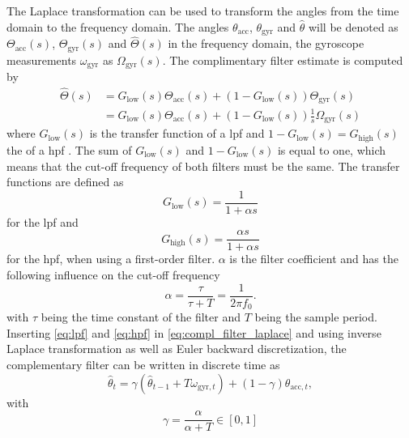 The Laplace transformation can be used to transform the angles from the time domain to the frequency domain.
The angles $\theta_\mathrm{acc}$, $\theta_\mathrm{gyr}$ and $\hat{\theta}$ will be denoted as $\Theta_\mathrm{acc}(s)$, $\Theta_\mathrm{gyr}(s)$ and $\hat{\Theta}(s)$ in the frequency domain, the gyroscope measurements $\omega_\mathrm{gyr} $ as $\Omega_\mathrm{gyr} (s)$.
The complimentary filter estimate is computed by
\begin{align}
	\label{eq:compl_filter_laplace}
	\hat{\Theta}(s) & = G_\mathrm{low}(s)\Theta_\mathrm{acc}(s) + (1 - G_\mathrm{low}(s))\Theta_\mathrm{gyr}(s) \nonumber   \\
	                & = G_\mathrm{low}(s)\Theta_\mathrm{acc}(s) + (1 - G_\mathrm{low}(s))\frac{1}{s}\Omega_\mathrm{gyr} (s)
\end{align}
where $G_\mathrm{low}(s)$ is the transfer function of a \gls{lpf} and $1-G_\mathrm{low}(s) = G_\mathrm{high}(s)$ the of a \gls{hpf} \cite{Kok2017}.
The sum of $G_\mathrm{low}(s)$ and $1-G_\mathrm{low}(s)$ is equal to one, which means that the cut-off frequency of both filters must be the same.
The transfer functions are defined as
\begin{equation}
	\label{eq:lpf}
	G_\mathrm{low} (s) = \frac{1}{1 + \alpha s}
\end{equation}
for the \gls{lpf} and
\begin{equation}
	\label{eq:hpf}
	G_\mathrm{high} (s) = \frac{\alpha s}{1 + \alpha s}
\end{equation}
for the \gls{hpf}, when using a first-order filter.
$\alpha$ is the filter coefficient and has the following influence on the cut-off frequency
\begin{equation}
	\alpha
	= \frac{\tau}{\tau + T}
	= \frac{1}{2\pi f_0}.
	\label{eq:filter_f0}
\end{equation}
with $\tau$ being the time constant of the filter and $T$ being the sample period.
Inserting \cref{eq:lpf} and \cref{eq:hpf} in \cref{eq:compl_filter_laplace} and using inverse Laplace transformation as well as Euler backward discretization, the complementary filter can be written in discrete time as
\begin{equation}
	\hat{\theta}_t = \gamma\left(\hat{\theta}_{t - 1} + T \omega_{\mathrm{gyr},t}\right) + (1 - \gamma) \theta_{\mathrm{acc},t},
\end{equation}
with
\begin{equation}
	\label{eq:filter_gain}
	\gamma = \frac{\alpha}{\alpha + T} \in [0,1]
\end{equation}
